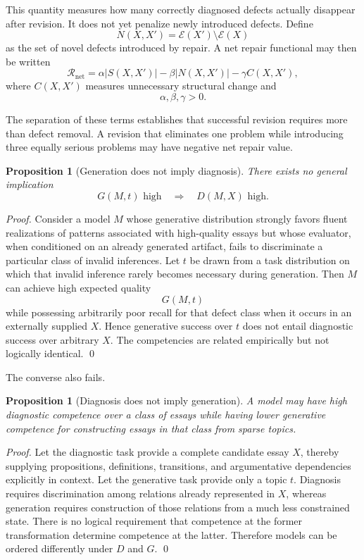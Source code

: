 \documentclass[11pt]{article}
\newtheorem{proposition}[definition]{Proposition}
\begin{document}
This quantity measures how many correctly diagnosed defects actually disappear after revision. It does not yet penalize newly introduced defects. Define
\[
    N(X,X')
    =
    \mathcal{E}(X')\setminus\mathcal{E}(X)
\]
as the set of novel defects introduced by repair. A net repair functional may then be written
\[
    \mathcal{R}_{\mathrm{net}}
    =
    \alpha |S(X,X')|
    -
    \beta |N(X,X')|
    -
    \gamma C(X,X'),
\]
where \(C(X,X')\) measures unnecessary structural change and
\[
    \alpha,\beta,\gamma>0.
\]

The separation of these terms establishes that successful revision requires more than defect removal. A revision that eliminates one problem while introducing three equally serious problems may have negative net repair value.

\begin{proposition}[Generation does not imply diagnosis]
There exists no general implication
\[
    G(M,t)\text{ high}
    \quad\Longrightarrow\quad
    D(M,X)\text{ high}.
\]
\end{proposition}

\begin{proof}
Consider a model \(M\) whose generative distribution strongly favors fluent realizations of patterns associated with high-quality essays but whose evaluator, when conditioned on an already generated artifact, fails to discriminate a particular class of invalid inferences. Let \(t\) be drawn from a task distribution on which that invalid inference rarely becomes necessary during generation. Then \(M\) can achieve high expected quality
\[
    G(M,t)
\]
while possessing arbitrarily poor recall for that defect class when it occurs in an externally supplied \(X\). Hence generative success over \(t\) does not entail diagnostic success over arbitrary \(X\). The competencies are related empirically but not logically identical. \qed
\end{proof}

The converse also fails.

\begin{proposition}[Diagnosis does not imply generation]
A model may have high diagnostic competence over a class of essays while having lower generative competence for constructing essays in that class from sparse topics.
\end{proposition}

\begin{proof}
Let the diagnostic task provide a complete candidate essay \(X\), thereby supplying propositions, definitions, transitions, and argumentative dependencies explicitly in context. Let the generative task provide only a topic \(t\). Diagnosis requires discrimination among relations already represented in \(X\), whereas generation requires construction of those relations from a much less constrained state. There is no logical requirement that competence at the former transformation determine competence at the latter. Therefore models can be ordered differently under \(D\) and \(G\). \qed
\end{proof}
\end{document}
